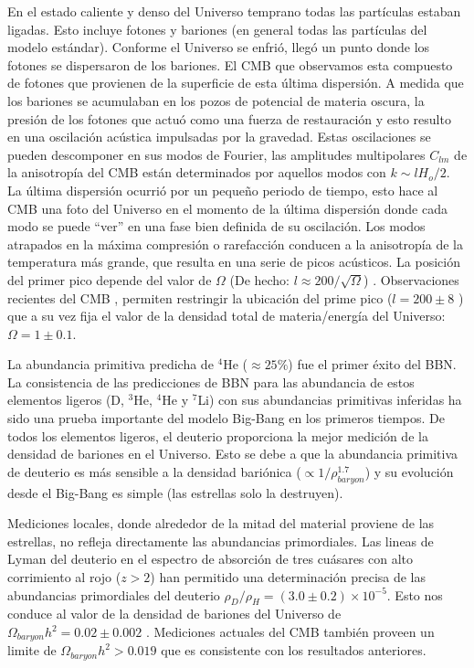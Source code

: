 En el estado caliente y denso del Universo temprano todas las partículas estaban ligadas. Esto incluye fotones y bariones (en general todas las partículas del modelo estándar). Conforme el Universo se enfrió, llegó un punto donde los fotones se dispersaron de los bariones. El CMB que observamos esta compuesto de fotones que provienen de la superficie de esta última dispersión. A medida que los bariones se acumulaban en los pozos de potencial de materia oscura, la presión de los fotones que actuó como una fuerza de restauración y esto resulto en una oscilación acústica impulsadas por la gravedad. Estas oscilaciones se pueden descomponer en sus modos de Fourier, las amplitudes multipolares $C_{lm}$ de la anisotropía del CMB están determinados por aquellos modos con $k\sim lH_o /2$. La última dispersión ocurrió por un pequeño periodo de tiempo, esto hace al CMB una foto del Universo en el momento de la última dispersión donde cada modo se puede ``ver'' en una fase bien definida de su oscilación. Los modos atrapados en la máxima compresión o rarefacción conducen a la anisotropía de la temperatura más grande, que resulta en una serie de picos acústicos. La posición del primer pico depende del valor de $\Omega$ (De hecho: $l \approx 200/\sqrt{\Omega}$) \cite{1999ASPC..165..431T}. Observaciones recientes del CMB \cite{ 2013ApJS..208...20B, 2020A&A...641A...1P}, permiten restringir la ubicación del prime pico ($l = 200 \pm 8$ \cite{2001ApJ...549..669H}) que a su vez fija el valor de la densidad total de materia/energía del Universo: $\Omega = 1 \pm 0.1$.

La abundancia primitiva predicha de $^4$He ($\approx 25\%$) fue el primer éxito del BBN. La consistencia de las predicciones de BBN  para las abundancia de estos elementos ligeros (D, $^3$He, $^4$He y $^7$Li) con sus abundancias primitivas inferidas ha sido una prueba importante del modelo Big-Bang en los primeros tiempos. De todos los elementos ligeros, el deuterio proporciona la mejor medición de la densidad de bariones en el Universo. Esto se debe a que la  abundancia primitiva de deuterio es más sensible a la densidad bariónica ($\propto 1/\rho_{baryon}^{1.7} $) y su evolución desde el Big-Bang es simple (las estrellas solo la destruyen).

Mediciones locales, donde alrededor de la mitad del material proviene de las estrellas, no refleja directamente las abundancias primordiales. Las lineas de Lyman del deuterio en el espectro de absorción de tres cuásares con alto corrimiento al rojo ($z>2$) han permitido una determinación precisa de las abundancias primordiales del deuterio $\rho_D/\rho_H = \left( 3.0 \pm 0.2 \right)\times 10^{-5 }$\cite{2001ApJ...552L...1B}. Esto nos conduce al valor de la densidad de bariones del Universo de $\Omega_{baryon}h^2 = 0.02 \pm 0.002$ \cite{2001ApJ...552L...1B}. Mediciones actuales del CMB también proveen un limite de $\Omega_{baryon}h^2 > 0.019$ \cite{2001ApJ...549..669H} que es consistente con los resultados anteriores.

